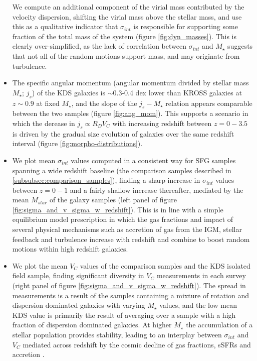 \documentclass[fleqn,usenatbib]{mn2e}
\begin{document}
\begin{itemize}
    We compute an additional component of the virial mass contributed by the velocity dispersion, shifting the virial mass above the stellar mass, and use this as a qualitative indicator that $\sigma_{int}$ is responsible for supporting some fraction of the total mass of the system (figure \ref{fig:dyn_masses}).
    This is clearly over-simplified, as the lack of correlation between $\sigma_{int}$ and $M_{\star}$ suggests that not all of the random motions support mass, and may originate from turbulence.
    \item The specific angular momentum (angular momentum divided by stellar mass $M_{\star}$; $j_{s}$) of the KDS galaxies is $\sim$0.3-0.4 dex lower than KROSS galaxies at $z\sim0.9$ at fixed $M_{\star}$, and the slope of the $j_{s}-M_{\star}$ relation appears comparable between the two samples (figure \ref{fig:ang_mom}).
    This supports a scenario in which the derease in $j_{s} \propto R_{D}V_{C}$ with increasing redshift between $z=0-3.5$ is driven by the gradual size evolution of galaxies over the same redshift interval (figure \ref{fig:morpho-distributions}).
    \item We plot mean $\sigma_{int}$ values computed in a consistent way for SFG samples spanning a wide redshift baseline (the comparison samples described in \cref{subsubsec:comparison_samples}), finding a sharp increase in $\sigma_{int}$ values between $z=0-1$ and a fairly shallow increase thereafter, mediated by the mean $M_{star}$ of the galaxy samples (left panel of figure \ref{fig:sigma_and_v_sigma_w_redshift}).
    This is in line with a simple equilibrium model prescription in which the gas fractions and impact of several physical mechanisms such as accretion of gas from the IGM, stellar feedback and turbulence increase with redshift and combine to boost random motions within high redshift galaxies.
    \item We plot the mean $V_{C}$ values of the comparison samples and the KDS isolated field sample, finding significant diversity in $V_{C}$ measurements in each survey (right panel of figure \ref{fig:sigma_and_v_sigma_w_redshift}).
    The spread in measurements is a result of the samples containing a mixture of rotation and dispersion dominated galaxies with varying $M_{\star}$ values, and the low mean KDS value is primarily the result of averaging over a sample with a high fraction of dispersion dominated galaxies.
    At higher $M_{\star}$ the accumulation of a stellar population provides stability, leading to an interplay between $\sigma_{int}$ and $V_{C}$ mediated across redshift by the cosmic decline of gas fractions, sSFRs and accretion \citep[e.g.][]{Wisnioski2015}. 

\end{itemize}
\end{document}
